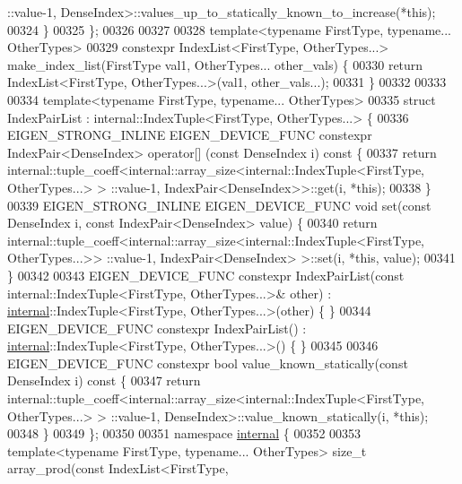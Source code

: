 \begin{DoxyCode}
      ::value-1, DenseIndex>::values\_up\_to\_statically\_known\_to\_increase(*\textcolor{keyword}{this});
00324   \}
00325 \};
00326 
00327 
00328 \textcolor{keyword}{template}<\textcolor{keyword}{typename} FirstType, \textcolor{keyword}{typename}... OtherTypes>
00329 constexpr IndexList<FirstType, OtherTypes...> make\_index\_list(FirstType val1, OtherTypes... other\_vals) \{
00330   \textcolor{keywordflow}{return} IndexList<FirstType, OtherTypes...>(val1, other\_vals...);
00331 \}
00332 
00333 
00334 \textcolor{keyword}{template}<\textcolor{keyword}{typename} FirstType, \textcolor{keyword}{typename}... OtherTypes>
00335 \textcolor{keyword}{struct }IndexPairList : internal::IndexTuple<FirstType, OtherTypes...> \{
00336   EIGEN\_STRONG\_INLINE EIGEN\_DEVICE\_FUNC constexpr IndexPair<DenseIndex> operator[] (\textcolor{keyword}{const} DenseIndex i)\textcolor{keyword}{
       const }\{
00337     \textcolor{keywordflow}{return} internal::tuple\_coeff<internal::array\_size<internal::IndexTuple<FirstType, OtherTypes...> >
      ::value-1, IndexPair<DenseIndex>>::get(i, *\textcolor{keyword}{this});
00338   \}
00339   EIGEN\_STRONG\_INLINE EIGEN\_DEVICE\_FUNC \textcolor{keywordtype}{void} \textcolor{keyword}{set}(\textcolor{keyword}{const} DenseIndex i, \textcolor{keyword}{const} IndexPair<DenseIndex> value) \{
00340     \textcolor{keywordflow}{return} internal::tuple\_coeff<internal::array\_size<internal::IndexTuple<FirstType, OtherTypes...>>
      ::value-1, IndexPair<DenseIndex> >::set(i, *\textcolor{keyword}{this}, value);
00341   \}
00342 
00343   EIGEN\_DEVICE\_FUNC  constexpr IndexPairList(\textcolor{keyword}{const} internal::IndexTuple<FirstType, OtherTypes...>& other) :
       \hyperlink{namespaceinternal}{internal}::IndexTuple<FirstType, OtherTypes...>(other) \{ \}
00344   EIGEN\_DEVICE\_FUNC  constexpr IndexPairList() : \hyperlink{namespaceinternal}{internal}::IndexTuple<FirstType, OtherTypes...>() \{
       \}
00345 
00346   EIGEN\_DEVICE\_FUNC constexpr \textcolor{keywordtype}{bool} value\_known\_statically(\textcolor{keyword}{const} DenseIndex i)\textcolor{keyword}{ const }\{
00347     \textcolor{keywordflow}{return} internal::tuple\_coeff<internal::array\_size<internal::IndexTuple<FirstType, OtherTypes...> >
      ::value-1, DenseIndex>::value\_known\_statically(i, *\textcolor{keyword}{this});
00348   \}
00349 \};
00350 
00351 \textcolor{keyword}{namespace }\hyperlink{namespaceinternal}{internal} \{
00352 
00353 \textcolor{keyword}{template}<\textcolor{keyword}{typename} FirstType, \textcolor{keyword}{typename}... OtherTypes> \textcolor{keywordtype}{size\_t} array\_prod(\textcolor{keyword}{const} IndexList<FirstType,

\end{DoxyCode}
